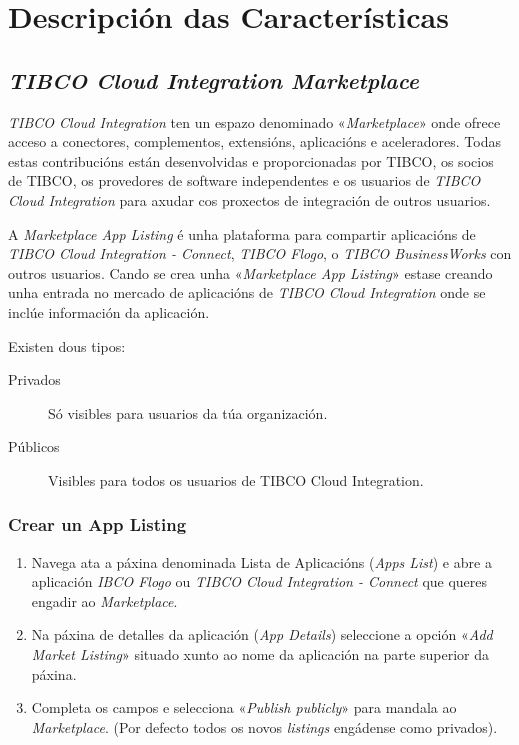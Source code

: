 \chapter{Descripción das Características}
\label{chap:DescripciónDasCaracteristicas}

\section{\textit{TIBCO Cloud Integration Marketplace}}

\textit{TIBCO Cloud Integration} ten un espazo denominado «\textit{Marketplace}» onde ofrece acceso a conectores, complementos, extensións, aplicacións e aceleradores. Todas estas contribucións están desenvolvidas e proporcionadas por TIBCO, os socios de TIBCO, os provedores de software independentes e os usuarios de \textit{TIBCO Cloud Integration} para axudar cos proxectos de integración de outros usuarios.

A \textit{Marketplace App Listing} é unha plataforma para compartir aplicacións de \textit{TIBCO Cloud Integration - Connect}, \textit{TIBCO Flogo}, o \textit{TIBCO BusinessWorks} con outros usuarios. Cando se crea unha «\textit{Marketplace App Listing}» estase creando unha entrada no mercado de aplicacións de \textit{TIBCO Cloud Integration} onde se inclúe información da aplicación.

Existen dous tipos:

\begin{description}
    \item[Privados] Só visibles para usuarios da túa organización.
    \item[Públicos] Visibles para todos os usuarios de TIBCO Cloud Integration.
\end{description}

\subsection{Crear un App Listing}

\begin{enumerate}
	\item Navega ata a páxina denominada Lista de Aplicacións (\textit{Apps List}) e abre a aplicación  \textit{IBCO Flogo} ou \textit{TIBCO Cloud Integration - Connect} que queres engadir ao \textit{Marketplace}.
	
	\item Na páxina de detalles da aplicación (\textit{App Details}) seleccione a opción «\textit{Add Market Listing}» situado xunto ao nome da aplicación na parte superior da páxina.
	
	\item Completa os campos e selecciona «\textit{Publish publicly}» para mandala ao \textit{Marketplace}. (Por defecto todos os novos \textit{listings} engádense como privados).
\end{enumerate}

